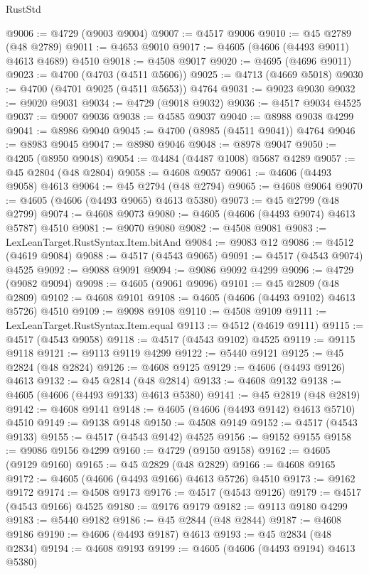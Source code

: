 \begin{lexlean}{RustStd}
\begin{coremodule}
@9006 := @4729 (@9003 @9004)
@9007 := @4517 @9006
@9010 := @45 @2789 (@48 @2789)
@9011 := @4653 @9010
@9017 := @4605 (@4606 (@4493 @9011) @4613 @4689) @4510
@9018 := @4508 @9017
@9020 := @4695 (@4696 @9011)
@9023 := @4700 (@4703 (@4511 @5606))
@9025 := @4713 (@4669 @5018)
@9030 := @4700 (@4701 @9025 (@4511 @5653)) @4764
@9031 := @9023 @9030
@9032 := @9020 @9031
@9034 := @4729 (@9018 @9032)
@9036 := @4517 @9034 @4525
@9037 := @9007 @9036
@9038 := @4585 @9037
@9040 := @8988 @9038 @4299
@9041 := @8986 @9040
@9045 := @4700 (@8985 (@4511 @9041)) @4764
@9046 := @8983 @9045
@9047 := @8980 @9046
@9048 := @8978 @9047
@9050 := @4205 (@8950 @9048)
@9054 := @4484 (@4487 @1008) @5687 @4289
@9057 := @45 @2804 (@48 @2804)
@9058 := @4608 @9057
@9061 := @4606 (@4493 @9058) @4613
@9064 := @45 @2794 (@48 @2794)
@9065 := @4608 @9064
@9070 := @4605 (@4606 (@4493 @9065) @4613 @5380)
@9073 := @45 @2799 (@48 @2799)
@9074 := @4608 @9073
@9080 := @4605 (@4606 (@4493 @9074) @4613 @5787) @4510
@9081 := @9070 @9080
@9082 := @4508 @9081
@9083 := LexLeanTarget.RustSyntax.Item.bitAnd
@9084 := @9083 @12
@9086 := @4512 (@4619 @9084)
@9088 := @4517 (@4543 @9065)
@9091 := @4517 (@4543 @9074) @4525
@9092 := @9088 @9091
@9094 := @9086 @9092 @4299
@9096 := @4729 (@9082 @9094)
@9098 := @4605 (@9061 @9096)
@9101 := @45 @2809 (@48 @2809)
@9102 := @4608 @9101
@9108 := @4605 (@4606 (@4493 @9102) @4613 @5726) @4510
@9109 := @9098 @9108
@9110 := @4508 @9109
@9111 := LexLeanTarget.RustSyntax.Item.equal
@9113 := @4512 (@4619 @9111)
@9115 := @4517 (@4543 @9058)
@9118 := @4517 (@4543 @9102) @4525
@9119 := @9115 @9118
@9121 := @9113 @9119 @4299
@9122 := @5440 @9121
@9125 := @45 @2824 (@48 @2824)
@9126 := @4608 @9125
@9129 := @4606 (@4493 @9126) @4613
@9132 := @45 @2814 (@48 @2814)
@9133 := @4608 @9132
@9138 := @4605 (@4606 (@4493 @9133) @4613 @5380)
@9141 := @45 @2819 (@48 @2819)
@9142 := @4608 @9141
@9148 := @4605 (@4606 (@4493 @9142) @4613 @5710) @4510
@9149 := @9138 @9148
@9150 := @4508 @9149
@9152 := @4517 (@4543 @9133)
@9155 := @4517 (@4543 @9142) @4525
@9156 := @9152 @9155
@9158 := @9086 @9156 @4299
@9160 := @4729 (@9150 @9158)
@9162 := @4605 (@9129 @9160)
@9165 := @45 @2829 (@48 @2829)
@9166 := @4608 @9165
@9172 := @4605 (@4606 (@4493 @9166) @4613 @5726) @4510
@9173 := @9162 @9172
@9174 := @4508 @9173
@9176 := @4517 (@4543 @9126)
@9179 := @4517 (@4543 @9166) @4525
@9180 := @9176 @9179
@9182 := @9113 @9180 @4299
@9183 := @5440 @9182
@9186 := @45 @2844 (@48 @2844)
@9187 := @4608 @9186
@9190 := @4606 (@4493 @9187) @4613
@9193 := @45 @2834 (@48 @2834)
@9194 := @4608 @9193
@9199 := @4605 (@4606 (@4493 @9194) @4613 @5380)

\end{coremodule}
\end{lexlean}
